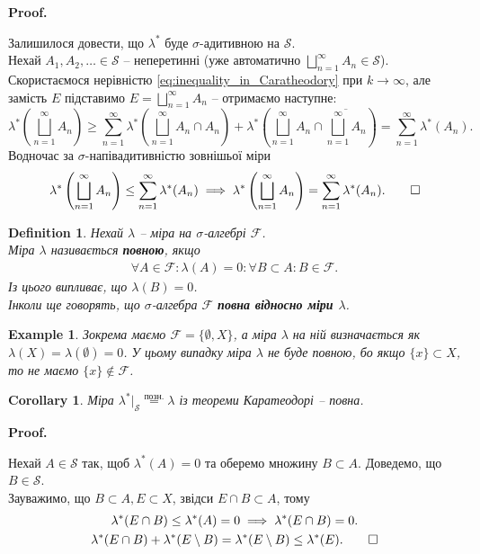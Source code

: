 \documentclass[a4paper, 10pt]{article}
\makeatletter
\theoremstyle{theoremdd}
\newtheorem{definition}[theorem]{Definition}
\newtheorem{example}[theorem]{Example}
\newtheorem{corollary}[theorem]{Corollary}
\renewenvironment{proof}[1][Proof.\\]{\par
\pushQED{\hfill \qed}%
\normalfont \topsep6\p@\@plus6\p@\relax
\trivlist
\item\relax
{\bfseries
#1\@addpunct{.}}\hspace\labelsep\ignorespaces
}{%
\popQED\endtrivlist\@endpefalse
}
\makeatother
\begin{document}
\begin{proof}
Залишилося довести, що $\lambda^*$ буде $\sigma$-адитивною на $\mathcal{S}$.\\
Нехай $A_1,A_2,\dots \in \mathcal{S}$ -- неперетинні (уже автоматично $\displaystyle\bigsqcup_{n=1}^\infty A_n \in \mathcal{S}$). Скористаємося нерівністю \eqref{eq:inequality_in_Caratheodory} при $k \to \infty$, але замість $E$ підставимо $E = \displaystyle\bigsqcup_{n=1}^\infty A_n$ -- отримаємо наступне:
\[
\displaystyle\lambda^*\left(\bigsqcup_{n=1}^\infty A_n \right) \geq \sum_{n=1}^\infty \lambda^*\left(\bigsqcup_{n=1}^\infty A_n \cap A_n\right) + \lambda^*\left(\bigsqcup_{n=1}^\infty A_n \cap \overline{\bigsqcup_{n=1}^\infty A_n} \right) = \sum_{n=1}^\infty \lambda^*(A_n).
\]
Водночас за $\sigma$-напівадитивністю зовнішьої міри
\begin{gather*}
\displaystyle\lambda^*\left(\bigsqcup_{n=1}^\infty A_n\right) \leq \sum_{n=1}^\infty \lambda^*(A_n) \implies \lambda^*\left(\bigsqcup_{n=1}^\infty A_n\right) = \sum_{n=1}^\infty \lambda^*(A_n). \qedhere
\end{gather*}
\end{proof}

\begin{definition}
Нехай $\lambda$ -- міра на $\sigma$-алгебрі $\mathcal{F}$.\\
Міра $\lambda$ називається \textbf{повною}, якщо
\begin{align*}
\forall A \in \mathcal{F}: \lambda(A) = 0: \forall B \subset A: B \in \mathcal{F}.
\end{align*}
Із цього випливає, що $\lambda(B) = 0$.\\
Інколи ще говорять, що $\sigma$-алгебра $\mathcal{F}$ \textbf{повна відносно міри $\lambda$}.
\end{definition}

\begin{example}
Зокрема маємо $\mathcal{F} = \{\emptyset,X\}$, а міра $\lambda$ на ній визначається як $\lambda(X) = \lambda(\emptyset) = 0$. У цьому випадку міра $\lambda$ не буде повною, бо якщо $\{x\} \subset X$, то не маємо $\{x\} \notin \mathcal{F}$.
\end{example}

\begin{corollary}
Міра $\lambda^*|_{\mathcal{S}} \overset{\text{позн.}}{=} \lambda$ із теореми Каратеодорі -- повна.
\end{corollary}

\begin{proof}
Нехай $A \in \mathcal{S}$ так, щоб $\lambda^*(A) = 0$ та оберемо множину $B \subset A$. Доведемо, що $B \in \mathcal{S}$.\\
Зауважимо, що $B \subset A, E \subset X$, звідси $E \cap B \subset A$, тому
\begin{gather*}
\lambda^*(E \cap B) \leq \lambda^*(A) = 0 \implies \lambda^*(E \cap B) = 0. \\
\lambda^*(E \cap B) + \lambda^*(E \setminus B) = \lambda^*(E \setminus B) \leq \lambda^*(E). \qedhere
\end{gather*}
\end{proof}
\end{document}
